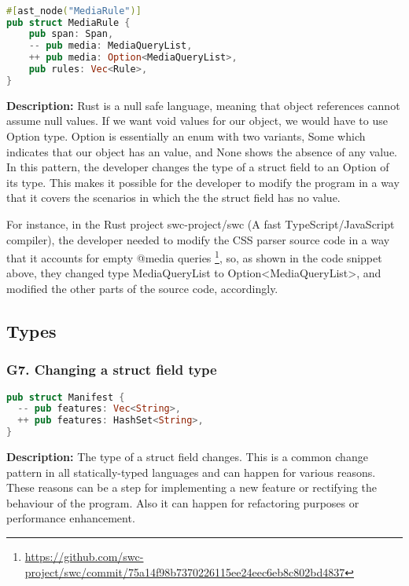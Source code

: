\begin{lstlisting}[language=Rust, style=colouredRust, label={l3}]

#[ast_node("MediaRule")]
pub struct MediaRule {
    pub span: Span,
    -- pub media: MediaQueryList,
    ++ pub media: Option<MediaQueryList>,
    pub rules: Vec<Rule>,
}

\end{lstlisting}

\noindent \textbf{Description:} Rust is a null safe language, meaning that object references cannot assume null values. If we want void values for our object, we would have to use Option type. Option is essentially an enum with two variants, Some which indicates that our object has an value, and None shows the absence of any value. In this pattern, the developer changes the type of a struct field to an Option of its type. This makes it possible for the developer to modify the program in a way that it covers the scenarios in which the the struct field has no value.

For instance, in the Rust project swc-project/swc (A fast TypeScript/JavaScript compiler), the developer needed to modify the CSS parser source code in a way that it accounts for empty @media queries \footnote{\url{https://github.com/swc-project/swc/commit/75a14f98b7370226115ee24eec6eb8c802bd4837}}, so, as shown in the code snippet above, they changed type MediaQueryList to Option<MediaQueryList>, and modified the other parts of the source code, accordingly.


\subsection{Types}
\subsubsection{G7. Changing a struct field type}

\begin{lstlisting}[language=Rust, style=colouredRust, label={l3}]
pub struct Manifest {
  -- pub features: Vec<String>,
  ++ pub features: HashSet<String>,
}

\end{lstlisting}

\noindent \textbf{Description:} The type of a struct field changes. This is a common change pattern in all statically-typed languages and can happen for various reasons. These reasons can be a step for implementing a new feature or rectifying the behaviour of the program. Also it can happen for refactoring purposes or performance enhancement.


